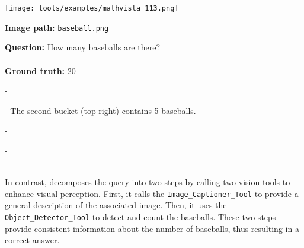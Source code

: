
\begin{querybox}
\begin{minipage}{0.3\linewidth}
    \texttt{[image: tools/examples/mathvista\_113.png]}
\end{minipage}
\hspace{5pt}
\begin{minipage}{0.55\linewidth}
    \textbf{Image path:} \texttt{baseball.png}
    
    \textbf{Question:} How many baseballs are there?
    \\\\
    \textbf{Ground truth:} 20
\end{minipage}
\end{querybox}


\begin{querybox}

- 

- The second bucket (top right) contains 5 baseballs.

- 

- 
\\\\
\end{querybox}

In contrast, \model decomposes the query into two steps by calling two vision tools to enhance visual perception. First, it calls the \texttt{Image\_Captioner\_Tool} to provide a general description of the associated image. Then, it uses the \texttt{Object\_Detector\_Tool} to detect and count the baseballs. These two steps provide consistent information about the number of baseballs, thus resulting in a correct answer.

